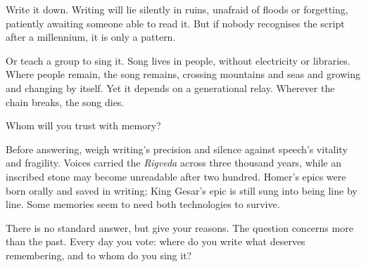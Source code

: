 Write it down. Writing will lie silently in ruins, unafraid of floods or forgetting, patiently awaiting someone able to read it. But if nobody recognises the script after a millennium, it is only a pattern.

Or teach a group to sing it. Song lives in people, without electricity or libraries. Where people remain, the song remains, crossing mountains and seas and growing and changing by itself. Yet it depends on a generational relay. Wherever the chain breaks, the song dies.

Whom will you trust with memory?

Before answering, weigh writing's precision and silence against speech's vitality and fragility. Voices carried the \emph{Rigveda} across three thousand years, while an inscribed stone may become unreadable after two hundred. Homer's epics were born orally and saved in writing; King Gesar's epic is still sung into being line by line. Some memories seem to need both technologies to survive.

There is no standard answer, but give your reasons. The question concerns more than the past. Every day you vote: where do you write what deserves remembering, and to whom do you sing it?
